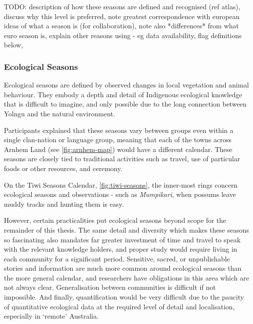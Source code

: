 TODO:
description of how these seasons are defined and recognised (ref atlas),
discuss why this level is preferred,
note greatest correspondence with european ideas of what a season is (for collaboration),
note also *differences* from what euro season is,
explain other reasons using - eg data availability,
flag definitions below,





\subsubsection{Ecological Seasons}
Ecological seasons are defined by observed changes in local vegetation
and animal behaviour.  They embody a depth and detail of Indigenous
ecological knowledge that is difficult to imagine, and only possible
due to the long connection between Yolngu and the natural environment.

Participants explained that these seasons vary between groups even within
a single clan-nation or language group, meaning that each of the towns
across Arnhem Land (see \autoref{fig:arnhem-map}) would have a different
calendar.  
%
These seasons are closely tied to traditional activities such as travel,
use of particular foods or other resources, and ceremony.

On the Tiwi Seasons Calendar, \autoref{fig:tiwi-seasons}, the inner-most
rings concern ecological seasons and observations - such as
\textit{Mumpikari}, when possums leave muddy tracks and hunting them is easy.

However, certain practicalities put ecological seasons beyond scope
for the remainder of this thesis.
%
The same detail and diversity which makes these seasons so fascinating
also mandates far greater investment of time and travel to speak
with the relevant knowledge holders, and proper study would require
living in each community for a significant period.
%
Sensitive, sacred, or unpublishable stories and information are much more
common around ecological seasons than the more general calendar,
and researchers have obligations in this area which are not always clear.
%
Generalisation between communities is difficult if not impossible.
%
And finally, quantification would be very difficult due to the paucity
of quantitative ecological data at the required level of detail
and localisation, especially in `remote' Australia.





